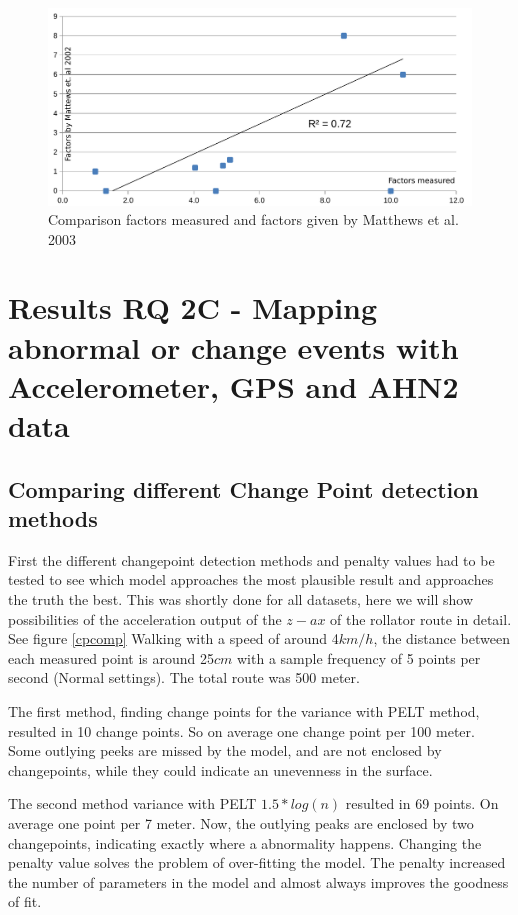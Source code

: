 \begin{figure}[hb]
\includegraphics[width=\textwidth]{img/R_factors_compared.pdf}
\centering
\caption[Comparison factors measured and factors given]{
Comparison factors measured and factors given by Matthews et al. 2003\label{comparefig}}
\end{figure} 

\clearpage



\section{Results RQ 2C - Mapping abnormal or change events with Accelerometer, GPS and AHN2 data}

\subsection{Comparing different Change Point detection methods}

First the different changepoint detection methods and penalty values had to be tested to see which model approaches the most plausible result and approaches the truth the best. This was shortly done for all datasets, here we will show possibilities of the acceleration output of the $z-ax$ of the rollator route in detail. See figure \ref{cpcomp} Walking with a speed of around 4$km/h$, the distance between each measured point is  around 25$cm$ with a sample frequency of 5 points per second (Normal settings). The total route was 500 meter. 

The first method, finding change points for the variance with PELT method, resulted in 10 change points. So on average one change point per 100 meter. Some outlying peeks are missed by the model, and are not enclosed by changepoints, while they could indicate an unevenness in the surface. 

The second method variance with PELT $1.5*log(n)$ resulted in 69 points. On average one point per 7 meter. Now, the outlying peaks are enclosed by two changepoints, indicating exactly where a abnormality happens. Changing the penalty value solves the problem of over-fitting the model. The penalty increased the number of parameters in the model and almost always improves the goodness of fit. 



